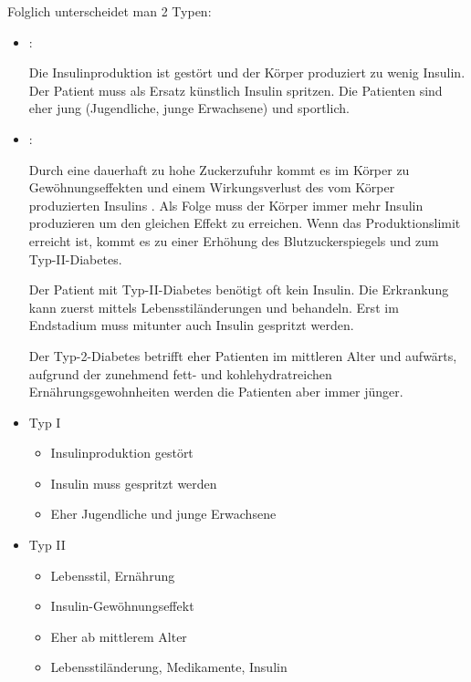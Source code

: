 Folglich unterscheidet man 2 Typen:



{
\begin{itemize}
  \item {}:   
  
  Die Insulinproduktion ist gestört
  und der Körper produziert zu wenig Insulin. Der Patient
  muss als Ersatz künstlich Insulin spritzen.  Die Patienten
  sind eher jung (Jugendliche, junge Erwachsene) und
  sportlich.
  
  
  \item {}:
  
  Durch eine
  dauerhaft zu hohe Zuckerzufuhr kommt es im Körper zu
  Gewöhnungseffekten und einem Wirkungsverlust des vom
  Körper produzierten Insulins . Als
  Folge muss der Körper immer mehr Insulin produzieren um
  den gleichen Effekt zu erreichen. Wenn das
  Produktionslimit erreicht ist, kommt es zu einer Erhöhung
  des Blutzuckerspiegels und zum Typ-II-Diabetes.
  
  Der Patient mit Typ-II-Diabetes benötigt oft kein Insulin.
  Die Erkrankung kann zuerst mittels Lebensstiländerungen
  und  behandeln. Erst im Endstadium muss
  mitunter auch Insulin gespritzt werden.
  
  Der Typ-2-Diabetes betrifft eher Patienten im mittleren
  Alter und aufwärts, aufgrund der zunehmend fett- und
  kohlehydratreichen Ernährungsgewohnheiten werden die
  Patienten aber immer jünger.
\end{itemize}
}{
\begin{itemize}
  \item Typ I
  \begin{itemize}
    \item Insulinproduktion gestört
    \item Insulin muss gespritzt werden
    \item Eher Jugendliche und junge Erwachsene
  \end{itemize}
  \item Typ II
  \begin{itemize}
    \item Lebensstil, Ernährung
    \item Insulin-Gewöhnungseffekt
    \item Eher ab mittlerem Alter
    \item Lebensstiländerung, Medikamente, Insulin
  \end{itemize}
\end{itemize}
}{}{}{}


